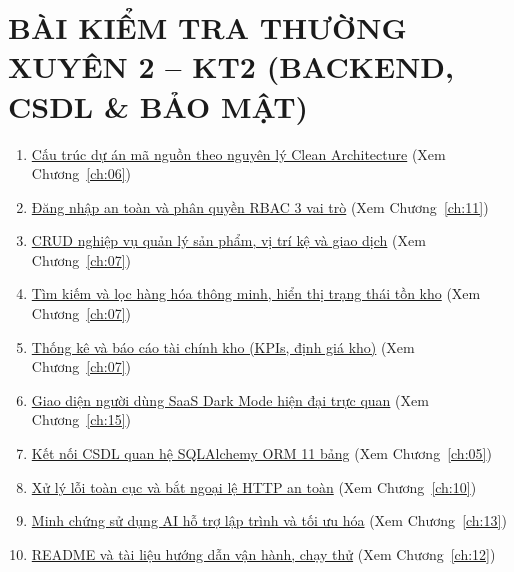 \documentclass[12pt,a4paper,oneside]{report}
\begin{document}
\section*{\hypertarget{sec:kt2_toc}{BÀI KIỂM TRA THƯỜNG XUYÊN 2 – KT2 (BACKEND, CSDL \& BẢO MẬT)}}
\begin{enumerate}
    \item \hyperlink{ch:06}{Cấu trúc dự án mã nguồn theo nguyên lý Clean Architecture} (Xem Chương~\ref{ch:06})
    \item \hyperlink{ch:11}{Đăng nhập an toàn và phân quyền RBAC 3 vai trò} (Xem Chương~\ref{ch:11})
    \item \hyperlink{ch:07}{CRUD nghiệp vụ quản lý sản phẩm, vị trí kệ và giao dịch} (Xem Chương~\ref{ch:07})
    \item \hyperlink{ch:07}{Tìm kiếm và lọc hàng hóa thông minh, hiển thị trạng thái tồn kho} (Xem Chương~\ref{ch:07})
    \item \hyperlink{ch:07}{Thống kê và báo cáo tài chính kho (KPIs, định giá kho)} (Xem Chương~\ref{ch:07})
    \item \hyperlink{ch:15}{Giao diện người dùng SaaS Dark Mode hiện đại trực quan} (Xem Chương~\ref{ch:15})
    \item \hyperlink{ch:05}{Kết nối CSDL quan hệ SQLAlchemy ORM 11 bảng} (Xem Chương~\ref{ch:05})
    \item \hyperlink{ch:10}{Xử lý lỗi toàn cục và bắt ngoại lệ HTTP an toàn} (Xem Chương~\ref{ch:10})
    \item \hyperlink{ch:13}{Minh chứng sử dụng AI hỗ trợ lập trình và tối ưu hóa} (Xem Chương~\ref{ch:13})
    \item \hyperlink{ch:12}{README và tài liệu hướng dẫn vận hành, chạy thử} (Xem Chương~\ref{ch:12})
\end{enumerate}
\end{document}
